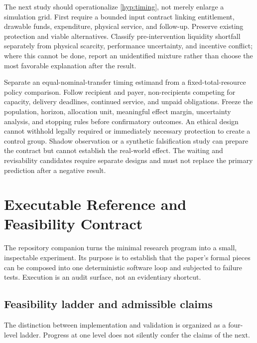 \documentclass[11pt,a4paper]{article}
\numberwithin{equation}{section}
\theoremstyle{definition}
\theoremstyle{plain}
\theoremstyle{remark}
\begin{document}
The next study should operationalize \cref{hyp:timing}, not merely enlarge a simulation grid. First require a bounded input contract linking entitlement, drawable funds, expenditure, physical service, and follow-up. Preserve existing protection and viable alternatives. Classify pre-intervention liquidity shortfall separately from physical scarcity, performance uncertainty, and incentive conflict; where this cannot be done, report an unidentified mixture rather than choose the most favorable explanation after the result.

Separate an equal-nominal-transfer timing estimand from a fixed-total-resource policy comparison. Follow recipient and payer, non-recipients competing for capacity, delivery deadlines, continued service, and unpaid obligations. Freeze the population, horizon, allocation unit, meaningful effect margin, uncertainty analysis, and stopping rules before confirmatory outcomes. An ethical design cannot withhold legally required or immediately necessary protection to create a control group. Shadow observation or a synthetic falsification study can prepare the contract but cannot establish the real-world effect. The waiting and revisability candidates require separate designs and must not replace the primary prediction after a negative result.

\section{Executable Reference and Feasibility Contract}

The repository companion turns the minimal research program into a small, inspectable experiment. Its purpose is to establish that the paper's formal pieces can be composed into one deterministic software loop and subjected to failure tests. Execution is an audit surface, not an evidentiary shortcut.

\subsection{Feasibility ladder and admissible claims}

The distinction between implementation and validation is organized as a four-level ladder. Progress at one level does not silently confer the claims of the next.
\end{document}
